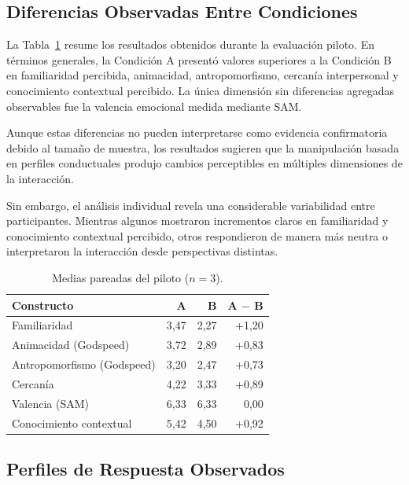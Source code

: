\documentclass[sigconf, nonacm, language=spanish]{acmart}
\begin{document}
\subsection{Diferencias Observadas Entre Condiciones}

La Tabla~\ref{tab:pilot-primary} resume los resultados obtenidos durante la evaluación piloto. En términos generales, la Condición A presentó valores superiores a la Condición B en familiaridad percibida, animacidad, antropomorfismo, cercanía interpersonal y conocimiento contextual percibido. La única dimensión sin diferencias agregadas observables fue la valencia emocional medida mediante SAM.

Aunque estas diferencias no pueden interpretarse como evidencia confirmatoria debido al tamaño de muestra, los resultados sugieren que la manipulación basada en perfiles conductuales produjo cambios perceptibles en múltiples dimensiones de la interacción.

Sin embargo, el análisis individual revela una considerable variabilidad entre participantes. Mientras algunos mostraron incrementos claros en familiaridad y conocimiento contextual percibido, otros respondieron de manera más neutra o interpretaron la interacción desde perspectivas distintas.

\begin{table}[t]
  \caption{Medias pareadas del piloto ($n=3$).}
  \label{tab:pilot-primary}
  \small
  \begin{tabular}{@{}lrrr@{}}
    \toprule
    \textbf{Constructo} & \textbf{A} & \textbf{B} & \textbf{A $-$ B} \\
    \midrule
    Familiaridad & 3,47 & 2,27 & +1,20 \\
    Animacidad (Godspeed) & 3,72 & 2,89 & +0,83 \\
    Antropomorfismo (Godspeed) & 3,20 & 2,47 & +0,73 \\
    Cercanía & 4,22 & 3,33 & +0,89 \\
    Valencia (SAM) & 6,33 & 6,33 & 0,00 \\
    Conocimiento contextual & 5,42 & 4,50 & +0,92 \\
    \bottomrule
  \end{tabular}
\end{table}

\subsection{Perfiles de Respuesta Observados}
\end{document}
